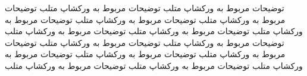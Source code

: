 توضیحات مربوط به ورکشاپ متلب توضیحات مربوط به ورکشاپ متلب توضیحات مربوط به ورکشاپ متلب توضیحات مربوط به ورکشاپ متلب توضیحات مربوط به ورکشاپ متلب توضیحات مربوط به ورکشاپ متلب توضیحات مربوط به ورکشاپ متلب توضیحات مربوط به ورکشاپ متلب توضیحات مربوط به ورکشاپ متلب توضیحات مربوط به ورکشاپ متلب توضیحات مربوط به ورکشاپ متلب توضیحات مربوط به ورکشاپ متلب توضیحات مربوط به ورکشاپ متلب توضیحات مربوط به ورکشاپ متلب

